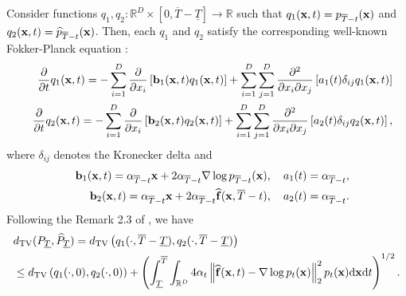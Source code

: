 \documentclass[twoside,11pt]{article}
\newcommand{\bb}{{\bf b}}
\newcommand{\bff}{{\bf f}}
\newcommand{\bx}{{\bf x}}
\newcommand{\bbR}{{\mathbb R}}
\newcommand{\be}{\begin{equation}}
\newcommand{\ee}{\end{equation}}
\newcommand{\bean}{\setlength\arraycolsep{1pt}\begin{eqnarray*}}
\newcommand{\eean}{\end{eqnarray*}}
\def\d{{\rm d}}
\begin{document}
Consider functions $q_1, q_2 : \bbR^{D} \times [0,\overline{T}-\underline{T}] \rightarrow \bbR$ such that $q_1(\bx,t) = p_{\overline{T}-t}(\bx)$ and $q_2(\bx,t) = \widehat p_{\overline{T}-t} (\bx)$.
Then, each $q_1$ and $q_2$ satisfy the corresponding well-known Fokker-Planck equation \citep{lebris2008existence, bogachev2022fokker, pavliotis2014stochastic} :
\bean
&& \frac{\partial }{\partial t} q_1(\bx,t) = - \sum_{i=1}^{D} \frac{\partial}{\partial x_i} \left[ \bb_1 (\bx,t) q_1(\bx,t) \right] + \sum_{i=1}^{D} \sum_{j=1}^{D} \frac{\partial^2}{\partial x_i \partial x_j} \left[ a_1(t) \delta_{ij} q_1(\bx,t) \right]
\\
&& \frac{\partial }{\partial t} q_2(\bx,t) = - \sum_{i=1}^{D} \frac{\partial}{\partial x_i} \left[ \bb_2 (\bx,t) q_2(\bx,t) \right] + \sum_{i=1}^{D} \sum_{j=1}^{D} \frac{\partial^2}{\partial x_i \partial x_j} \left[ a_2(t) \delta_{ij} q_2(\bx,t) \right],
\eean
where $\delta_{ij}$ denotes the Kronecker delta and
\bean
&& \bb_1 (\bx,t) = \alpha_{\overline{T}-t} \bx + 2 \alpha_{\overline{T}-t} \nabla \log p_{\overline{T}-t} (\bx), \quad a_1(t) = \alpha_{\overline{T}-t},
\\
&& \bb_2 (\bx,t) = \alpha_{\overline{T}-t} \bx + 2 \alpha_{\overline{T}-t} \widehat \bff( \bx, \overline{T}-t), \quad a_2(t) =  \alpha_{\overline{T}-t}.
\eean
Following the Remark 2.3 of \citet{bogachev2016distances}, we have
\be \begin{split}
& d_{\rm TV} (P_{\underline{T}},  \widehat P_{\underline{T}}) = d_{\rm TV} \left( q_{1}(\cdot, \overline{T} - \underline{T}),  q_{2}(\cdot, \overline{T} - \underline{T})  \right) 
\\
& \leq d_{\rm TV} \left( q_{1}(\cdot, 0),  q_{2}(\cdot, 0 )  \right)  + 
\left( \int_{\underline{T}}^{\overline{T}} \int_{\bbR^{D}} 4 \alpha_{t} \left\| \widehat \bff (\bx,t) - \nabla \log p_t( \bx) \right\|_2^2 p_t(\bx) \d \bx \d t \right)^{1/2}.
\label{eqthm2:secineq}
\end{split} \ee
\end{document}
